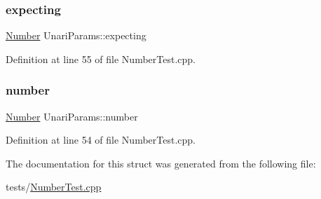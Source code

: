 \subsubsection{\texorpdfstring{expecting}{expecting}}
{\footnotesize\ttfamily \hyperlink{classteam22_1_1_math_1_1_number}{Number} Unari\+Params\+::expecting}



Definition at line 55 of file Number\+Test.\+cpp.

\mbox{\label{struct_unari_params_a85762f9bb00163170524b43c7947dca1}} 
\subsubsection{\texorpdfstring{number}{number}}
{\footnotesize\ttfamily \hyperlink{classteam22_1_1_math_1_1_number}{Number} Unari\+Params\+::number}



Definition at line 54 of file Number\+Test.\+cpp.



The documentation for this struct was generated from the following file\+:\begin{DoxyCompactItemize}
\item 
tests/\hyperlink{_number_test_8cpp}{Number\+Test.\+cpp}\end{DoxyCompactItemize}
